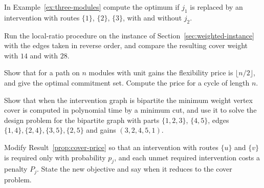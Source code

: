 \begin{exercise}
In Example~\ref{ex:three-modules} compute the optimum if $j_1$ is replaced by an intervention with routes $\{1\}$, $\{2\}$, $\{3\}$, with and without $j_2$.
\end{exercise}

\begin{exercise}
Run the local-ratio procedure on the instance of Section~\ref{sec:weighted-instance} with the edges taken in reverse order, and compare the resulting cover weight with $14$ and with $28$.
\end{exercise}

\begin{exercise}
Show that for a path on $n$ modules with unit gains the flexibility price is $\lfloor n/2\rfloor$, and give the optimal commitment set. Compute the price for a cycle of length $n$.\label{ex2:path-price}
\end{exercise}

\begin{exercise}
Show that when the intervention graph is bipartite the minimum weight vertex cover is computed in polynomial time by a minimum cut, and use it to solve the design problem for the bipartite graph with parts $\{1,2,3\}$, $\{4,5\}$, edges $\{1,4\},\{2,4\},\{3,5\},\{2,5\}$ and gains $(3,2,4,5,1)$.\label{ex2:bipartite}
\end{exercise}

\begin{exercise}
Modify Result~\ref{prop:cover-price} so that an intervention with routes $\{u\}$ and $\{v\}$ is required only with probability $p_j$, and each unmet required intervention costs a penalty $P_j$. State the new objective and say when it reduces to the cover problem.
\end{exercise}

